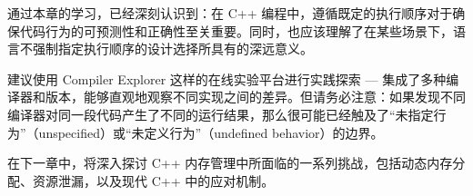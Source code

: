 通过本章的学习，已经深刻认识到：在 C++ 编程中，遵循既定的执行顺序对于确保代码行为的可预测性和正确性至关重要。同时，也应该理解了在某些场景下，语言不强制指定执行顺序的设计选择所具有的深远意义。

建议使用 Compiler Explorer 这样的在线实验平台进行实践探索 --- 集成了多种编译器和版本，能够直观地观察不同实现之间的差异。但请务必注意：如果发现不同编译器对同一段代码产生了不同的运行结果，那么很可能已经触及了“未指定行为”（unspecified）或“未定义行为”（undefined behavior）的边界。

在下一章中，将深入探讨 C++ 内存管理中所面临的一系列挑战，包括动态内存分配、资源泄漏，以及现代 C++ 中的应对机制。